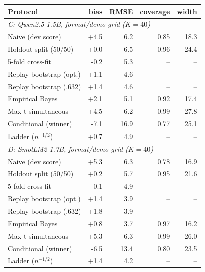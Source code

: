 \begin{tabular}{lrrrr}\toprule
Protocol & bias & RMSE & coverage & width \\\midrule
\multicolumn{5}{l}{\emph{C: Qwen2.5-1.5B, format/demo grid ($K{=}40$)}} \\
Naive (dev score) & +4.5 & 6.2 & 0.85 & 18.3 \\
Holdout split (50/50) & +0.0 & 6.5 & 0.96 & 24.4 \\
5-fold cross-fit & -0.2 & 5.3 & -- & -- \\
Replay bootstrap (opt.) & +1.1 & 4.6 & -- & -- \\
Replay bootstrap (.632) & +1.4 & 4.6 & -- & -- \\
Empirical Bayes & +2.1 & 5.1 & 0.92 & 17.4 \\
Max-t simultaneous & +4.5 & 6.2 & 0.99 & 27.8 \\
Conditional (winner) & -7.1 & 16.9 & 0.77 & 25.1 \\
Ladder ($n^{-1/2}$) & +0.7 & 4.9 & -- & -- \\
\multicolumn{5}{l}{\emph{D: SmolLM2-1.7B, format/demo grid ($K{=}40$)}} \\
Naive (dev score) & +5.3 & 6.3 & 0.78 & 16.9 \\
Holdout split (50/50) & +0.2 & 5.7 & 0.95 & 21.6 \\
5-fold cross-fit & -0.1 & 4.9 & -- & -- \\
Replay bootstrap (opt.) & +1.4 & 3.9 & -- & -- \\
Replay bootstrap (.632) & +1.8 & 3.9 & -- & -- \\
Empirical Bayes & +0.8 & 3.7 & 0.97 & 16.2 \\
Max-t simultaneous & +5.3 & 6.3 & 0.99 & 26.0 \\
Conditional (winner) & -6.5 & 13.4 & 0.80 & 23.5 \\
Ladder ($n^{-1/2}$) & +1.4 & 4.2 & -- & -- \\
\bottomrule
\end{tabular}
